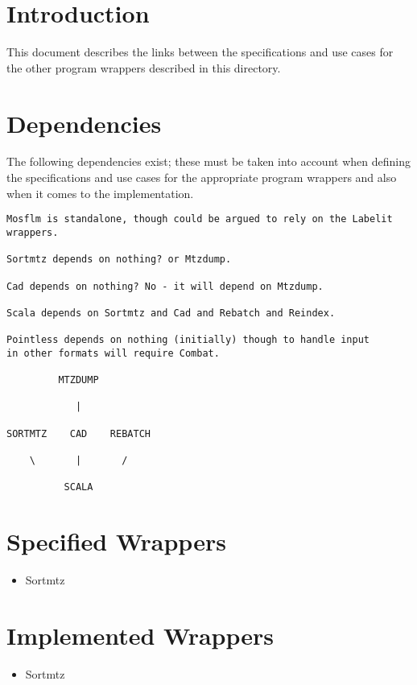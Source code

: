 \documentclass[a4paper, 11pt]{article}
\begin{document}
\section{Introduction}

This document describes the links between the specifications and use cases
for the other program wrappers described in this directory. 

\section{Dependencies}

The following dependencies exist; these must be taken into account when
defining the specifications and use cases for the appropriate program
wrappers and also when it comes to the implementation.

{
\tiny
\begin{verbatim}
Mosflm is standalone, though could be argued to rely on the Labelit
wrappers.

Sortmtz depends on nothing? or Mtzdump.

Cad depends on nothing? No - it will depend on Mtzdump.

Scala depends on Sortmtz and Cad and Rebatch and Reindex.

Pointless depends on nothing (initially) though to handle input
in other formats will require Combat.

         MTZDUMP

            |

SORTMTZ    CAD    REBATCH

    \       |       /

          SCALA 
\end{verbatim}
}


\section{Specified Wrappers}

\begin{itemize}
\item{Sortmtz}
\end{itemize}


\section{Implemented Wrappers}

\begin{itemize}
\item{Sortmtz}
\end{itemize}
\end{document}
